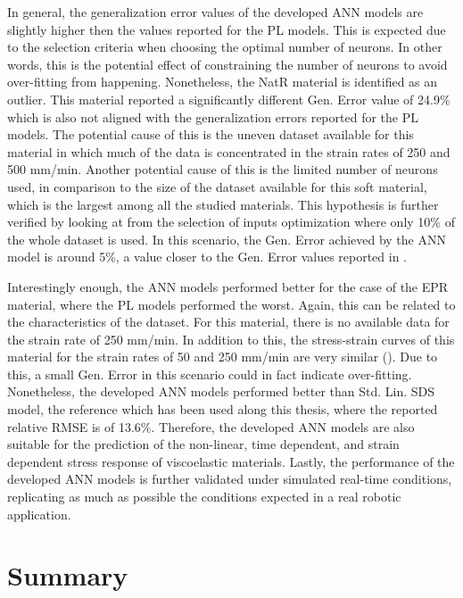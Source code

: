 In general, the generalization error values of the developed ANN models are slightly higher then the values reported for the PL models. This is expected due to the selection criteria when choosing the optimal number of neurons. In other words, this is the potential effect of constraining the number of neurons to avoid over-fitting from happening. Nonetheless, the NatR material is identified as an outlier. This material reported a significantly different Gen. Error value of 24.9\% which is also not aligned with the generalization errors reported for the PL models. The potential cause of this is the uneven dataset available for this material in which much of the data is concentrated in the strain rates of 250 and 500 mm/min. Another potential cause of this is the limited number of neurons used, in comparison to the size of the dataset available for this soft material, which is the largest among all the studied materials. This hypothesis is further verified by looking at  from the selection of inputs optimization where only 10\% of the whole dataset is used. In this scenario, the Gen. Error achieved by the ANN model is around 5\%, a value closer to the Gen. Error values reported in .

Interestingly enough, the ANN models performed better for the case of the EPR material, where the PL models performed the worst. Again, this can be related to the characteristics of the dataset. For this material, there is no available data for the strain rate of 250 mm/min. In addition to this, the stress-strain curves of this material for the strain rates of 50 and 250 mm/min are very similar (). Due to this, a small Gen. Error in this scenario could in fact indicate over-fitting. Nonetheless, the developed ANN models performed better than Std. Lin. SDS model, the reference which has been used along this thesis, where the reported relative RMSE is of 13.6\%. Therefore, the developed ANN models are also suitable for the prediction of the non-linear, time dependent, and strain dependent stress response of viscoelastic materials. Lastly, the performance of the developed ANN models is further validated under simulated real-time conditions, replicating as much as possible the conditions expected in a real robotic application.

\section{Summary}



